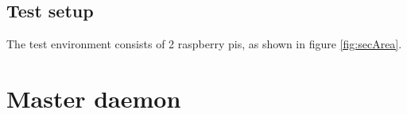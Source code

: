\subsection{Test setup}

The test environment consists of 2 raspberry pis, as shown in figure \ref{fig:secArea}. 

\section{Master daemon}



